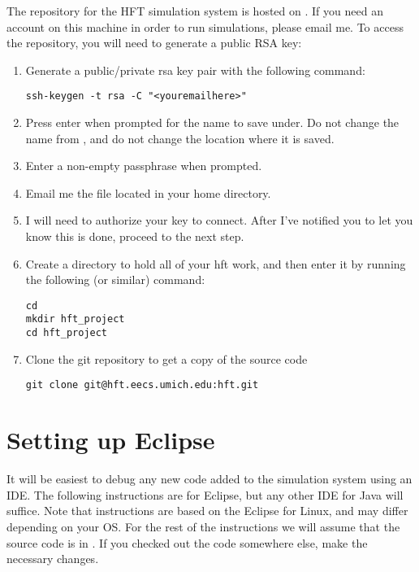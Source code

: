\documentclass[11pt]{article}
\begin{document}
The repository for the HFT simulation system is hosted on . If
you
need an account on this machine in order to run simulations, please email me.
To access the repository, you will need to generate a public RSA key:
\begin{enumerate}
\item Generate a public/private rsa key pair with the following command:

\begin{verbatim}
ssh-keygen -t rsa -C "<youremailhere>"
\end{verbatim}

\item Press enter when prompted for the name to save under. Do not change the
  name from , and do not change the location where it is saved.
\item Enter a non-empty passphrase when prompted.
\item Email me the  file located in your home directory.
\item I will need to authorize your key to connect. After I've notified you to
  let you know this is done, proceed to the next step.
\item Create a directory to hold all of your hft work, and then enter it by
  running the following (or similar) command:

\begin{verbatim}
cd
mkdir hft_project
cd hft_project
\end{verbatim}

\item Clone the git repository to get a copy of the source code

\begin{verbatim}
git clone git@hft.eecs.umich.edu:hft.git
\end{verbatim}

\end{enumerate}

\section{Setting up Eclipse}
It will be easiest to debug any new code added to the simulation system using an
IDE. The following instructions are for Eclipse, but any other IDE for Java will
suffice. Note that instructions are based on the Eclipse for Linux, and may
differ depending on your OS. For the rest of the instructions we will assume
that the source code is in . If you checked out the code
somewhere else, make the necessary changes.
\end{document}
